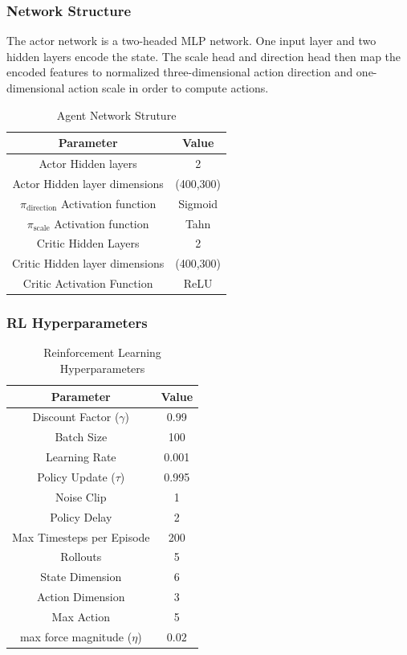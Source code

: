 \subsubsection{Network Structure}
The actor network is a two-headed MLP network. One input layer and two hidden layers encode the state. The scale head and direction head then map the encoded features to normalized three-dimensional action direction and one-dimensional action scale in order to compute actions.

\begin{table}[htbp]
\centering
\begin{tabular}{cc}
\toprule
\textbf{Parameter} & \textbf{Value} \\
\midrule
Actor Hidden layers & 2 \\
Actor Hidden layer dimensions & (400,300) \\
 $\pi_{\text{direction}}$ Activation function & Sigmoid \\
  $\pi_{\text{scale}}$ Activation function & Tahn \\
Critic Hidden Layers & 2 \\
Critic Hidden layer dimensions & (400,300) \\
Critic Activation Function & ReLU \\

\bottomrule
\end{tabular}
\caption{Agent Network Struture}
\end{table}

\subsubsection{RL Hyperparameters}

\begin{table}[t]
\centering
\begin{tabular}{cc}
\toprule
\textbf{Parameter} & \textbf{Value} \\
\midrule
Discount Factor (\(\gamma\)) & 0.99 \\
Batch Size & 100 \\
Learning Rate & 0.001 \\
Policy Update (\(\tau\)) & 0.995 \\
Noise Clip & 1 \\
Policy Delay & 2 \\
Max Timesteps per Episode & 200 \\
Rollouts & 5 \\
State Dimension & 6 \\
Action Dimension & 3 \\
Max Action & 5 \\
 max force magnitude ($\eta$) & $0.02$\\
\bottomrule
\end{tabular}
\caption{Reinforcement Learning Hyperparameters}
\end{table}

